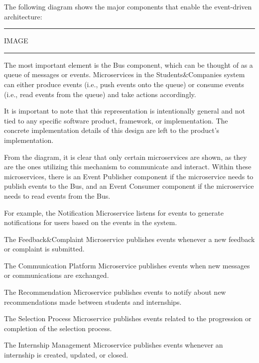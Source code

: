 The following diagram shows the major components that enable the event-driven architecture:

\vspace{20pt}
\hrule
\vspace{10pt}
IMAGE
\vspace{10pt}
\hrule
\vspace{20pt}

The most important element is the Bus component, which can be thought of as a queue of messages or events. Microservices in the Students\&Companies system can either produce events (i.e., push events onto the queue) or consume events (i.e., read events from the queue) and take actions accordingly.

It is important to note that this representation is intentionally general and not tied to any specific software product, framework, or implementation. The concrete implementation details of this design are left to the product's implementation.

From the diagram, it is clear that only certain microservices are shown, as they are the ones utilizing this mechanism to communicate and interact. Within these microservices, there is an Event Publisher component if the microservice needs to publish events to the Bus, and an Event Consumer component if the microservice needs to read events from the Bus.

For example, the Notification Microservice listens for events to generate notifications for users based on the events in the system.

The Feedback\&Complaint Microservice publishes events whenever a new feedback or complaint is submitted.

The Communication Platform Microservice publishes events when new messages or communications are exchanged.

The Recommendation Microservice publishes events to notify about new recommendations made between students and internships.

The Selection Process Microservice publishes events related to the progression or completion of the selection process.

The Internship Management Microservice publishes events whenever an internship is created, updated, or closed.

